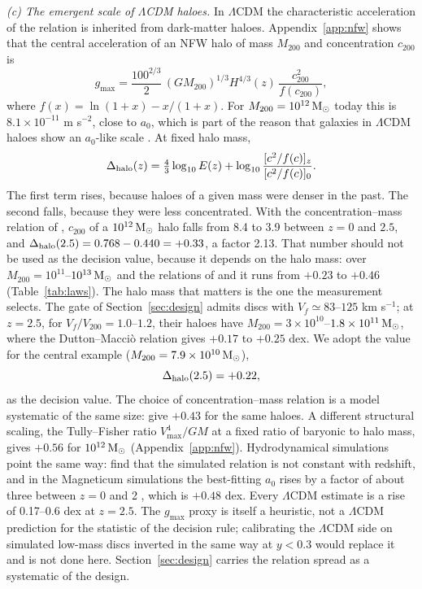 \documentclass[fleqn,usenatbib]{mnras}
\begin{document}
\emph{(c) The emergent scale of $\Lambda$CDM haloes.} In $\Lambda$CDM the characteristic acceleration of the relation is inherited from dark-matter haloes. Appendix~\ref{app:nfw} shows that the central acceleration of an NFW halo \citep{NFW1997} of mass $M_{200}$ and concentration $c_{200}$ is
\begin{equation}
g_{\max}=\frac{100^{2/3}}{2}\,(GM_{200})^{1/3}H^{4/3}(z)\,\frac{c_{200}^2}{f(c_{200})},
\label{eq:gmax}
\end{equation}
where $f(x)=\ln(1+x)-x/(1+x)$. For $M_{200}=10^{12}\,{\rm M_\odot}$ today this is $8.1\times10^{-11}$ m s$^{-2}$, close to $a_0$, which is part of the reason that galaxies in $\Lambda$CDM haloes show an $a_0$-like scale \citep{Navarro2017}. At fixed halo mass,
\begin{equation}
\Delta_{\rm halo}(z)=\tfrac43\log_{10}E(z)+\log_{10}\frac{[c^2/f(c)]_z}{[c^2/f(c)]_0} .
\label{eq:lawhalo}
\end{equation}
The first term rises, because haloes of a given mass were denser in the past. The second falls, because they were less concentrated. With the concentration--mass relation of \citet{DuttonMaccio2014}, $c_{200}$ of a $10^{12}\,{\rm M_\odot}$ halo falls from 8.4 to 3.9 between $z=0$ and $2.5$, and $\Delta_{\rm halo}(2.5)=0.768-0.440=+0.33$, a factor 2.13. That number should not be used as the decision value, because it depends on the halo mass: over $M_{200}=10^{11}$--$10^{13}\,{\rm M_\odot}$ and the relations of \citet{DuttonMaccio2014} and \citet{Duffy2008} it runs from $+0.23$ to $+0.46$ (Table~\ref{tab:laws}). The halo mass that matters is the one the measurement selects. The gate of Section~\ref{sec:design} admits discs with $V_f\simeq83$--$125$ km s$^{-1}$; at $z=2.5$, for $V_f/V_{200}=1.0$--$1.2$, their haloes have $M_{200}=3\times10^{10}$--$1.8\times10^{11}\,{\rm M_\odot}$, where the Dutton--Macci\`o relation gives $+0.17$ to $+0.25$ dex. We adopt the value for the central example ($M_{200}=7.9\times10^{10}\,{\rm M_\odot}$),
\begin{equation}
\Delta_{\rm halo}(2.5)=+0.22 ,
\label{eq:dgate}
\end{equation}
as the decision value. The choice of concentration--mass relation is a model systematic of the same size: \citet{Duffy2008} give $+0.43$ for the same haloes. A different structural scaling, the Tully--Fisher ratio $V_{\max}^4/GM$ at a fixed ratio of baryonic to halo mass, gives $+0.56$ for $10^{12}\,{\rm M_\odot}$ (Appendix~\ref{app:nfw}). Hydrodynamical simulations point the same way: \citet{KellerWadsley2017} find that the simulated relation is not constant with redshift, and in the Magneticum simulations the best-fitting $a_0$ rises by a factor of about three between $z=0$ and 2 \citep{Mayer2023}, which is $+0.48$ dex. Every $\Lambda$CDM estimate is a rise of 0.17--0.6 dex at $z=2.5$. The $g_{\max}$ proxy is itself a heuristic, not a $\Lambda$CDM prediction for the statistic of the decision rule; calibrating the $\Lambda$CDM side on simulated low-mass discs inverted in the same way at $y<0.3$ would replace it and is not done here. Section~\ref{sec:design} carries the relation spread as a systematic of the design.
\end{document}
